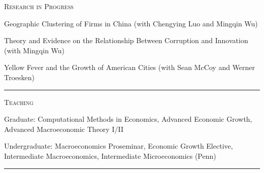 \documentclass{article}
\begin{document}
\parbox{\textwidth}{
\parbox[t]{0.28\textwidth}{ \raggedright \noindent \textsc{ Research in Progress } }
\parbox[t]{0.72\textwidth}{ \raggedright

Geographic Clustering of Firms in China (with Chengying Luo and Mingqin Wu)
\vspace{0.27cm}

Theory and Evidence on the Relationship Between Corruption and Innovation (with Mingqin Wu)
\vspace{0.27cm}

Yellow Fever and the Growth of American Cities (with Sean McCoy and Werner Troesken)
\vspace{0.27cm}

}
\textcolor{light-gray}{\hrule}
}
\vspace{0.3cm}

\parbox{\textwidth}{
\parbox[t]{0.28\textwidth}{ \raggedright \noindent \textsc{ Teaching } }
\parbox[t]{0.72\textwidth}{ \raggedright

Graduate: Computational Methods in Economics, Advanced Economic Growth, Advanced Macroeconomic Theory I/II
\vspace{0.27cm}

Undergraduate: Macroeconomics Proseminar, Economic Growth Elective, Intermediate Macroeconomics, Intermediate Microeconomics (Penn)
\vspace{0.27cm}

}
\textcolor{light-gray}{\hrule}
}
\vspace{0.3cm}
\end{document}
